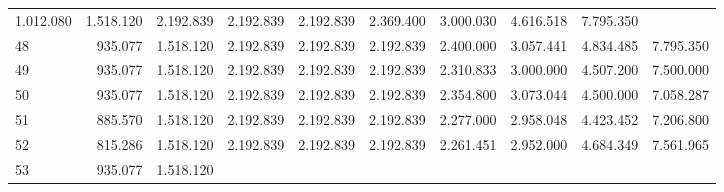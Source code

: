\begin{tabular}{llllllllll}
  \multicolumn{1}{|r}{1.012.080} &
  \multicolumn{1}{r}{1.518.120} &
  \multicolumn{1}{r}{2.192.839} &
  \multicolumn{1}{r}{2.192.839} &
  \multicolumn{1}{r}{2.192.839} &
  \multicolumn{1}{r}{2.369.400} &
  \multicolumn{1}{r}{3.000.030} &
  \multicolumn{1}{r}{4.616.518} &
  \multicolumn{1}{r}{7.795.350} \\
\multicolumn{1}{l}{\hspace{1em}48} &
  \multicolumn{1}{|r}{935.077} &
  \multicolumn{1}{r}{1.518.120} &
  \multicolumn{1}{r}{2.192.839} &
  \multicolumn{1}{r}{2.192.839} &
  \multicolumn{1}{r}{2.192.839} &
  \multicolumn{1}{r}{2.400.000} &
  \multicolumn{1}{r}{3.057.441} &
  \multicolumn{1}{r}{4.834.485} &
  \multicolumn{1}{r}{7.795.350} \\
\multicolumn{1}{l}{\hspace{1em}49} &
  \multicolumn{1}{|r}{935.077} &
  \multicolumn{1}{r}{1.518.120} &
  \multicolumn{1}{r}{2.192.839} &
  \multicolumn{1}{r}{2.192.839} &
  \multicolumn{1}{r}{2.192.839} &
  \multicolumn{1}{r}{2.310.833} &
  \multicolumn{1}{r}{3.000.000} &
  \multicolumn{1}{r}{4.507.200} &
  \multicolumn{1}{r}{7.500.000} \\
\multicolumn{1}{l}{\hspace{1em}50} &
  \multicolumn{1}{|r}{935.077} &
  \multicolumn{1}{r}{1.518.120} &
  \multicolumn{1}{r}{2.192.839} &
  \multicolumn{1}{r}{2.192.839} &
  \multicolumn{1}{r}{2.192.839} &
  \multicolumn{1}{r}{2.354.800} &
  \multicolumn{1}{r}{3.073.044} &
  \multicolumn{1}{r}{4.500.000} &
  \multicolumn{1}{r}{7.058.287} \\
\multicolumn{1}{l}{\hspace{1em}51} &
  \multicolumn{1}{|r}{885.570} &
  \multicolumn{1}{r}{1.518.120} &
  \multicolumn{1}{r}{2.192.839} &
  \multicolumn{1}{r}{2.192.839} &
  \multicolumn{1}{r}{2.192.839} &
  \multicolumn{1}{r}{2.277.000} &
  \multicolumn{1}{r}{2.958.048} &
  \multicolumn{1}{r}{4.423.452} &
  \multicolumn{1}{r}{7.206.800} \\
\multicolumn{1}{l}{\hspace{1em}52} &
  \multicolumn{1}{|r}{815.286} &
  \multicolumn{1}{r}{1.518.120} &
  \multicolumn{1}{r}{2.192.839} &
  \multicolumn{1}{r}{2.192.839} &
  \multicolumn{1}{r}{2.192.839} &
  \multicolumn{1}{r}{2.261.451} &
  \multicolumn{1}{r}{2.952.000} &
  \multicolumn{1}{r}{4.684.349} &
  \multicolumn{1}{r}{7.561.965} \\
\multicolumn{1}{l}{\hspace{1em}53} &
  \multicolumn{1}{|r}{935.077} &
  \multicolumn{1}{r}{1.518.120} &

\end{tabular}
